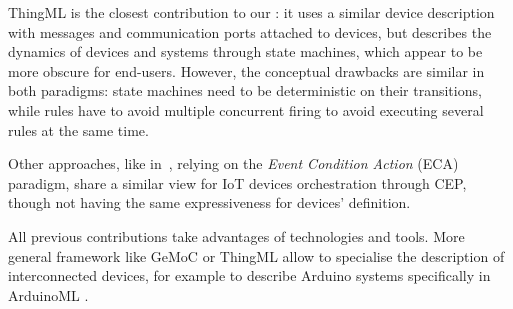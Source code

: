 ThingML \cite{Harrand-Fleurey-Morin-Husa:2016} is the closest contribution to our \DSL: it uses a similar device description with messages and communication ports attached to devices, but describes the dynamics of devices and systems through state machines, which appear to be more obscure for end-users. However, the conceptual drawbacks are similar in both paradigms: state machines need to be deterministic on their transitions, while rules have to avoid multiple concurrent firing to avoid executing several rules at the same time. 

Other approaches, like in~\cite{cheng-16}, relying on the \textit{Event Condition Action} (ECA) paradigm, share a similar view for IoT devices orchestration through CEP, though not having the same expressiveness for devices' definition.

All previous contributions take advantages of \MDE technologies and tools. More general \MDE framework like GeMoC \cite{Bousse-Degueule-Vojtisek-etAl:2016} or ThingML allow to specialise the description of interconnected devices, for example to describe Arduino systems specifically in ArduinoML \cite{Mosser-Collet-BlayFornarino:2014}.